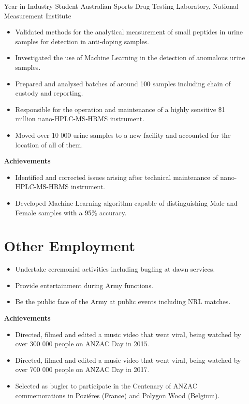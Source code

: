 {Year in Industry Student}
{Australian Sports Drug Testing Laboratory, National Measurement Institute}
{}{}
{%
  \begin{itemize}
    \item Validated methods for the analytical measurement of small peptides in urine samples
      for detection in anti-doping samples.
    \item Investigated the use of Machine Learning in the detection of anomalous urine samples.
    \item Prepared and analysed batches of around 100 samples including chain of custody and reporting.
    \item Responsible for the operation and maintenance of a highly sensitive \$1 million nano-HPLC-MS-HRMS instrument.
    \item Moved over 10 000 urine samples to a new facility and accounted for the location of all of them.
  \end{itemize}
  \textbf{Achievements}
  \begin{itemize}
    \item Identified and corrected issues arising after technical maintenance of nano-HPLC-MS-HRMS instrument.
    \item Developed Machine Learning algorithm capable of distinguishing Male and Female samples with a 95\% accuracy.
  \end{itemize}
}

\section{Other Employment}

{}{}
{%
  \begin{itemize}
    \item Undertake ceremonial activities including bugling at dawn services.
    \item Provide entertainment during Army functions.
    \item Be the public face of the Army at public events including NRL matches.
  \end{itemize}
  \textbf{Achievements}
  \begin{itemize}
    \item Directed, filmed and edited a music video  that went viral, being watched by over 300 000 people on ANZAC Day in 2015.
    \item Directed, filmed and edited a music video  that went viral, being watched by over 700 000 people on ANZAC Day in 2017.
    \item Selected as bugler to participate in the Centenary of ANZAC commemorations in Poziéres (France) and Polygon Wood (Belgium).
  \end{itemize}
}


